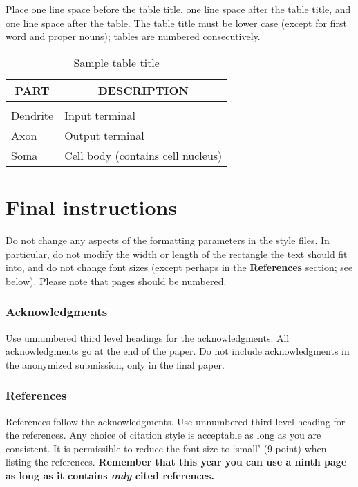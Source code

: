 \documentclass{article} %
\begin{document}
Place one line space before the table title, one line space after the table
title, and one line space after the table. The table title must be lower case
(except for first word and proper nouns); tables are numbered consecutively.

\begin{table}[t]
\caption{Sample table title}
\label{sample-table}
\begin{center}
\begin{tabular}{ll}
\multicolumn{1}{c}{\bf PART}  &\multicolumn{1}{c}{\bf DESCRIPTION}
\\ \hline \\
Dendrite         &Input terminal \\
Axon             &Output terminal \\
Soma             &Cell body (contains cell nucleus) \\
\end{tabular}
\end{center}
\end{table}

\section{Final instructions}
Do not change any aspects of the formatting parameters in the style files.
In particular, do not modify the width or length of the rectangle the text
should fit into, and do not change font sizes (except perhaps in the
\textbf{References} section; see below). Please note that pages should be
numbered.

\subsubsection*{Acknowledgments}

Use unnumbered third level headings for the acknowledgments. All
acknowledgments go at the end of the paper. Do not include 
acknowledgments in the anonymized submission, only in the 
final paper. 

\subsubsection*{References}

References follow the acknowledgments. Use unnumbered third level heading for
the references. Any choice of citation style is acceptable as long as you are
consistent. It is permissible to reduce the font size to `small' (9-point) 
when listing the references. {\bf Remember that this year you can use
a ninth page as long as it contains \emph{only} cited references.}
\end{document}
